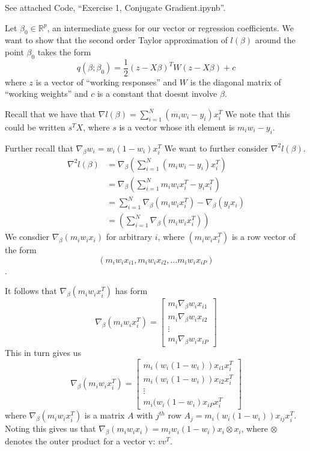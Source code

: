 \documentclass[12pt]{article}
\newcommand{\R}{\mathbb{R}}
\newenvironment{problem}[2][Exercise]{\begin{trivlist}
\item[\hskip \labelsep {\bfseries #1}\hskip \labelsep {\bfseries #2.}]}{\end{trivlist}}
\begin{document}
\begin{problem}{B}
See attached Code, ``Exercise 1, Conjugate Gradient.ipynb''.
\end{problem}

\begin{problem}{C}
Let $\beta_0 \in \R^p$, an intermediate guess for our vector or regression coefficients.
We want to show that the second order Taylor approximation of $l(\beta)$ around the point $\beta_0$ takes the form
$$q(\beta;\beta_0) = \frac{1}{2}(z - X\beta)^TW(z-X\beta) + c$$
where $z$ is a vector of ``working responses'' and $W$ is the diagonal matrix of ``working weights'' and $c$ is a constant that doesnt involve $\beta$.

Recall that we have that $\nabla l(\beta) = \sum_{i=1}^N(m_iw_i - y_i)x_i^T$
We note that this could be written $s^TX$, where $s$ is a vector whose ith element is $m_iw_i - y_i$.

Further recall that $\nabla_\beta w_i = w_i(1-w_i)x_i^T$
We want to further consider $\nabla^2 l(\beta)$.
\begin{align*}
\nabla^2 l(\beta) &= \nabla_\beta \left( \sum_{i=1}^N(m_iw_i - y_i)x_i^T \right)\\
&= \nabla_\beta \left( \sum_{i=1}^Nm_iw_ix_i^T - y_ix_i^T \right)\\
&=  \sum_{i=1}^N\nabla_\beta(m_iw_ix_i^T) - \nabla_\beta(y_ix_i)\\
&= \left(\sum_{i=1}^N \nabla_\beta(m_iw_ix_i^T)\right)
\end{align*}
We consdier $\nabla_\beta(m_iw_ix_i)$ for arbitrary $i$, where $(m_iw_ix_i^T)$ is a row vector of the form $$(m_iw_ix_{i1}, m_iw_ix_{i2}, \ldots m_iw_ix_{iP})$$.

It follows that $\nabla_\beta(m_iw_ix_i^T)$ has form
$$\nabla_\beta(m_iw_ix_i^T) = \left[\begin{array}{c} m_i \nabla_\beta w_i x_{i1} \\ m_i \nabla_\beta w_i x_{i2} \\ \vdots \\ m_i \nabla_\beta w_i x_{iP} \end{array}\right]$$
This in turn gives us
$$\nabla_\beta(m_iw_ix_i^T) = \left[\begin{array}{c} m_i (w_i(1-w_i)) x_{i1}x_i^T \\ m_i  (w_i(1-w_i)) x_{i2}x_i^T \\ \vdots \\ m_i (w_i(1-w_i) x_{iP}x_i^T \end{array}\right]$$
where $\nabla_\beta(m_iw_ix_i^T)$ is a matrix $A$ with $j^{th}$ row $A_j = m_i (w_i(1-w_i)) x_{ij}x_i^T$.
Noting this gives us that $\nabla_\beta(m_iw_ix_i) = m_iw_i(1-w_i)x_i \otimes x_i$, where $\otimes$ denotes the outer product for a vector v: $vv^T$.\


\end{problem}
\end{document}
